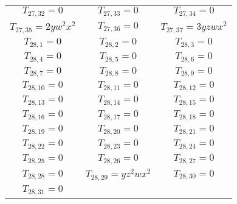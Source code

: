 \documentclass[12pt]{memoireuqam1.3}
\begin{document}
\begin{longtable}{|c|c|c|}
$T_{27,32}= 0$&

$T_{27,33}= 0$&

$T_{27,34}= 0$\\

$T_{27,35}= 2yw^2x^2$&

$T_{27,36}= 0$&

$T_{27,37}= 3yzwx^2$\\

$T_{28,1}= 0$&

$T_{28,2}= 0$&

$T_{28,3}= 0$\\

$T_{28,4}= 0$&

$T_{28,5}= 0$&

$T_{28,6}= 0$\\

$T_{28,7}= 0$&

$T_{28,8}= 0$&

$T_{28,9}= 0$\\

$T_{28,10}= 0$&

$T_{28,11}= 0$&

$T_{28,12}= 0$\\

$T_{28,13}= 0$&

$T_{28,14}= 0$&

$T_{28,15}= 0$\\

$T_{28,16}= 0$&

$T_{28,17}= 0$&

$T_{28,18}= 0$\\

$T_{28,19}= 0$&

$T_{28,20}= 0$&

$T_{28,21}= 0$\\

$T_{28,22}= 0$&

$T_{28,23}= 0$&

$T_{28,24}= 0$\\

$T_{28,25}= 0$&

$T_{28,26}= 0$&

$T_{28,27}= 0$\\

$T_{28,28}= 0$&

$T_{28,29}= yz^2wx^2$&

$T_{28,30}= 0$\\

$T_{28,31}= 0$&


\end{longtable}
\end{document}
